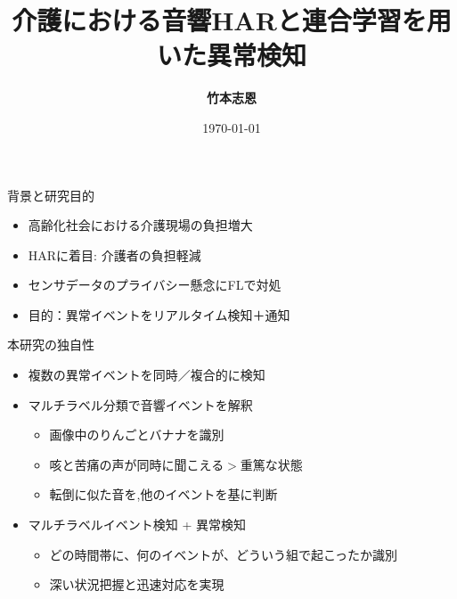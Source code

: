 \documentclass[unicode,12pt,aspectratio=169,dvipdfmx]{beamer}
\title{\textbf{介護における音響HARと連合学習を用いた異常検知}}
\author{\textbf{竹本志恩}}
\institute{\textbf{INIAD}}
\date{\today}
\begin{document}
\begin{frame}
  \titlepage
\end{frame}
\begin{frame}{背景と研究目的}
  \begin{itemize}
    \item 高齢化社会における介護現場の負担増大
    \item HARに着目: 介護者の負担軽減
    \item センサデータのプライバシー懸念にFLで対処
    \item 目的：異常イベントをリアルタイム検知＋通知
  \end{itemize}
\end{frame}
\begin{frame}{本研究の独自性}
  \begin{itemize}
    \item 複数の異常イベントを同時／複合的に検知
    \item マルチラベル分類で音響イベントを解釈
    \begin{itemize}
        \item 画像中のりんごとバナナを識別
        \item 咳と苦痛の声が同時に聞こえる$>$重篤な状態
        \item 転倒に似た音を,他のイベントを基に判断
    \end{itemize}
    \item マルチラベルイベント検知 + 異常検知
    \begin{itemize}
        \item どの時間帯に、何のイベントが、どういう組で起こったか識別
        \item 深い状況把握と迅速対応を実現
    \end{itemize}


  \end{itemize}
\end{frame}
\end{document}
